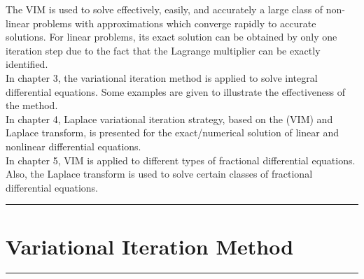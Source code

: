 \documentclass[12pt, a4paper]{report}
\begin{document}
The VIM is used to solve effectively, easily, and accurately a large class of non-linear problems with approximations which converge rapidly to accurate solutions. For linear problems, its exact solution can be obtained by only one iteration step due to the fact that the Lagrange multiplier can be exactly identified.\\

In chapter 3, the variational iteration method is applied to solve integral differential equations. Some examples are given to illustrate the effectiveness of the method.\\

In chapter 4, Laplace variational iteration strategy, based on the (VIM) and Laplace transform, is presented for the exact/numerical solution of linear and nonlinear differential equations.\\

In chapter 5, VIM is applied to different types of fractional differential equations. Also, the Laplace transform is used to solve certain classes of fractional differential equations.

\clearpage

\begin{singlespace}
\tableofcontents
\thispagestyle{empty}

\end{singlespace}
\clearpage






\bigskip %

\rule{\textwidth}{1.4pt} %

\bigskip %

\chapter{\textbf{\LARGE Variational Iteration Method}}

\bigskip %

\rule{\textwidth}{1.4pt} %

\bigskip %
\end{document}
